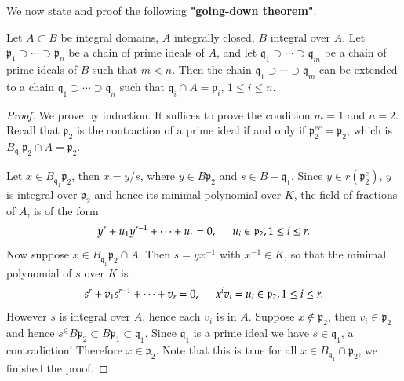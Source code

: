 We now state and proof the following \textbf{"going-down theorem"}.
\begin{theorem}
Let $A\subset B$ be integral domains, $A$ integrally closed, $B$ integral over $A$. Let $\mathfrak{p}_1\supset\cdots\supset\mathfrak{p}_n$ be a chain of prime ideals of $A$, and let $\mathfrak{q}_1\supset\cdots\supset\mathfrak{q}_m$ be a chain of prime ideals of $B$ such that $m<n$. Then the chain $\mathfrak{q}_1\supset\cdots\supset\mathfrak{q}_m$ can be extended to a chain $\mathfrak{q}_1\supset\cdots\supset\mathfrak{q}_n$ such that $\mathfrak{q}_i\cap A=\mathfrak{p}_i$, $1\le i\le n$.
\end{theorem}
\begin{proof}
We prove by induction. It suffices to prove the condition $m=1$ and $n=2$. Recall that $\mathfrak{p}_2$ is the contraction of a prime ideal if and only if $\mathfrak{p}_2^{ec}=\mathfrak{p}_2$, which is $B_{\mathfrak{q}_1}\mathfrak{p}_2\cap A=\mathfrak{p}_2$.\par
Let $x\in B_{\mathfrak{q}_1}\mathfrak{p}_2$, then $x=y/s$, where $y\in B\mathfrak{p}_2$ and $s\in B-\mathfrak{q}_1$. Since $y\in r(\mathfrak{p}_2^e)$, $y$ is integral over $\mathfrak{p}_2$ and hence its minimal polynomial over $K$, the field of fractions of $A$, is of the form 
$$
y^r+u_1y^{r-1}+\cdots +u_r=0,\hspace{0.5cm}u_i\in \mathfrak{p} _2,1\le i\le r.
$$
Now suppose $x\in B_{\mathfrak{q}_1}\mathfrak{p}_2\cap A$. Then $s=yx^{-1}$ with $x^{-1}\in K$, so that the minimal polynomial of $s$ over $K$ is
$$
s^r+v_1s^{r-1}+\cdots +v_r=0,\hspace{0.5cm}x^iv_i=u_i\in \mathfrak{p} _2,1\le i\le r.
$$
However $s$ is integral over $A$, hence each $v_i$ is in $A$. Suppose $x\notin\mathfrak{p}_2$, then $v_i\in\mathfrak{p}_2$ and hence $s^\in B\mathfrak{p}_2\subset B\mathfrak{p}_1\subset\mathfrak{q}_1$. Since $\mathfrak{q}_1$ is a prime ideal we have $s\in\mathfrak{q}_1$, a contradiction! Therefore $x\in\mathfrak{p}_2$. Note that this is true for all $x\in B_{\mathfrak{q}_1}\cap\mathfrak{p}_2$, we finished the proof.
\end{proof}
